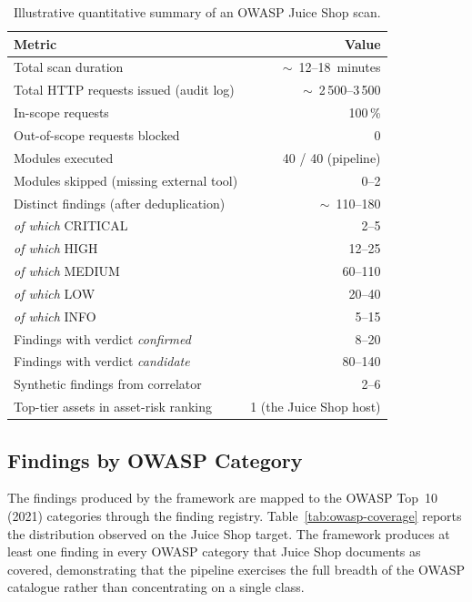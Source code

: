 \begin{table}[h]
\centering
\small
\begin{tabular}{|l|r|}
\hline
\textbf{Metric} & \textbf{Value} \\
\hline
Total scan duration                          & $\sim$~12--18~minutes \\
Total HTTP requests issued (audit log)       & $\sim$~2\,500--3\,500 \\
In-scope requests                            & 100\,\% \\
Out-of-scope requests blocked                & 0 \\
Modules executed                             & 40 / 40 (pipeline) \\
Modules skipped (missing external tool)      & 0--2 \\
Distinct findings (after deduplication)      & $\sim$~110--180 \\
\quad \textit{of which} CRITICAL              & 2--5 \\
\quad \textit{of which} HIGH                  & 12--25 \\
\quad \textit{of which} MEDIUM                & 60--110 \\
\quad \textit{of which} LOW                   & 20--40 \\
\quad \textit{of which} INFO                  & 5--15 \\
Findings with verdict \textit{confirmed}     & 8--20 \\
Findings with verdict \textit{candidate}     & 80--140 \\
Synthetic findings from correlator           & 2--6 \\
Top-tier assets in asset-risk ranking        & 1 (the Juice Shop host) \\
\hline
\end{tabular}
\caption{Illustrative quantitative summary of an OWASP Juice Shop scan.}
\label{tab:results-summary}
\end{table}

\subsection{Findings by OWASP Category}

The findings produced by the framework are mapped to the OWASP Top~10 (2021) categories through the finding registry. Table~\ref{tab:owasp-coverage} reports the distribution observed on the Juice Shop target. The framework produces at least one finding in every OWASP category that Juice Shop documents as covered, demonstrating that the pipeline exercises the full breadth of the OWASP catalogue rather than concentrating on a single class.

